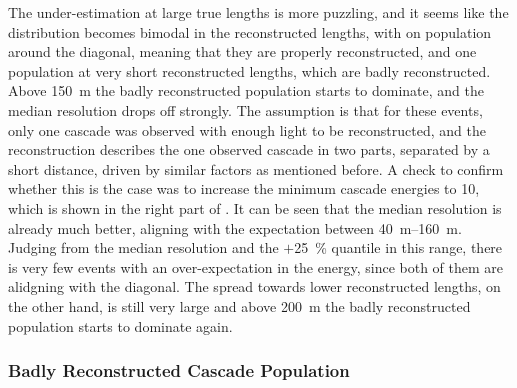 The under-estimation at large true lengths is more puzzling, and it seems like the distribution becomes bimodal in the reconstructed lengths, with on population around the diagonal, meaning that they are properly reconstructed, and one population at very short reconstructed lengths, which are badly reconstructed. Above \SI{150}{\meter} the badly reconstructed population starts to dominate, and the median resolution drops off strongly. The assumption is that for these events, only one cascade was observed with enough light to be reconstructed, and the reconstruction describes the one observed cascade in two parts, separated by a short distance, driven by similar factors as mentioned before. A check to confirm whether this is the case was to increase the minimum cascade energies to \SI{10}{\gev}, which is shown in the right part of . It can be seen that the median resolution is already much better, aligning with the expectation between \SIrange[range-phrase=~and~]{40}{160}{\meter}. Judging from the median resolution and the $+$\SI{25}{\percent} quantile in this range, there is very few events with an over-expectation in the energy, since both of them are alidgning with the diagonal. The spread towards lower reconstructed lengths, on the other hand, is still very large and above \SI{200}{\meter} the badly reconstructed population starts to dominate again.





\subsubsection{Badly Reconstructed Cascade Population}

